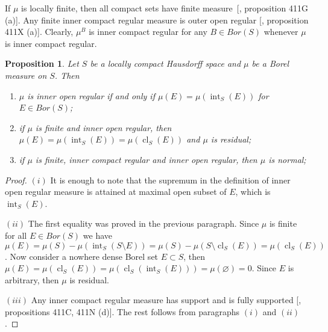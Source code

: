 \documentclass[12pt]{article}
\newtheorem{proposition}[theorem]{Proposition}
\begin{document}
If $\mu$ is locally finite, then all compact sets have finite
measure~[\cite{FremMeasTh4.1}, proposition 411G (a)]. Any finite inner compact
regular measure is outer open regular [\cite{FremMeasTh4.1}, proposition 411X
        (a)]. Clearly, $\mu^B$ is inner compact regular for any $B\in Bor(S)$ whenever
$\mu$ is inner compact regular.

\begin{proposition}\label{InnerOpenRegMeasCharac} Let $S$ be a locally compact
    Hausdorff space and $\mu$ be a Borel measure on $S$. Then
    \begin{enumerate}[label = (\roman*)]
        \item $\mu$ is inner open regular if and only if
              $\mu(E)=\mu(\operatorname{int}_S(E))$ for $E\in Bor(S)$;

        \item if $\mu$ is finite and inner open regular, then
              $\mu(E)=\mu(\operatorname{int}_S(E))=\mu(\operatorname{cl}_S(E))$
              and $\mu$ is residual;

        \item if $\mu$ is finite, inner compact regular and inner open regular,
              then $\mu$ is normal;
    \end{enumerate}
\end{proposition}
\begin{proof} $(i)$ It is enough to note that the supremum in the definition of
    inner open regular measure is attained at maximal open subset of $E$, which
    is $\operatorname{int}_S(E)$.

    $(ii)$ The first equality was proved in the previous paragraph. Since $\mu$
    is finite for all $E\in Bor(S)$ we have
    $\mu(E)=\mu(S)-\mu(\operatorname{int}_S(S\setminus E))=\mu(S)-\mu(S\setminus
        \operatorname{cl}_S(E))=\mu(\operatorname{cl}_S(E))$. Now consider a nowhere
    dense Borel set $E\subset S$, then $\mu(E)=\mu(\operatorname{cl}_S(E))
        =\mu(\operatorname{cl}_S(\operatorname{int}_S(E)))=\mu(\varnothing)=0$.
    Since $E$ is arbitrary, then $\mu$ is residual.

    $(iii)$ Any inner compact regular measure has support and is fully supported
        [\cite{FremMeasTh4.1}, propositions 411C, 411N (d)]. The rest follows
    from paragraphs $(i)$ and $(ii)$.
\end{proof}
\end{document}
